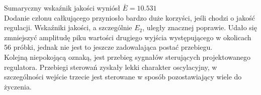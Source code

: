 Sumaryczny wskaźnik jakości wyniósł $\bar{E} = \num{10.531}$\\

Dodanie członu całkującego przyniosło bardzo duże korzyści, jeśli chodzi o jakość regulacji.
Wskaźniki jakości, a szczególnie $E_{\mathrm{2}}$, uległy znacznej poprawie. Udało się 
zmniejszyć amplitudę piku wartości drugiego wyjścia występującego w okolicach 56 próbki, jednak 
nie jest to jeszcze zadowalająca postać przebiegu.\\

Kolejną niepokojącą oznaką, jest przebieg sygnałów sterujących projektowanego regulatora.
Przebiegi sterowań zyskały lekki charakter oscylacyjny, w szczególności wejście trzecie jest 
sterowane w sposób pozostawiający wiele do życzenia. 


